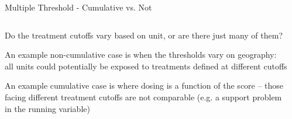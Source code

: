 \documentclass[notes,11pt, aspectratio=169]{beamer}
\newenvironment{wideitemize}{\itemize\addtolength{\itemsep}{10pt}}{\enditemize}
\begin{document}
\begin{frame}{Multiple Threshold - Cumulative vs. Not}
    \begin{columns}[onlytextwidth, T] %
      \begin{column}{.6\textwidth}
  \begin{wideitemize}
  \item Do the treatment cutoffs vary based on unit, or are there just many of them?
  \item An example non-cumulative case is when the thresholds vary on
    geography: all units could potentially be exposed to treatments
    defined at different cutoffs
  \item An example cumulative case is where dosing is a function of
    the score -- those facing different treatment cutoffs are not
    comparable (e.g. a support problem in the running variable)
  \end{wideitemize}
  \end{column}
      \begin{column}{.4\textwidth}

\end{column}
\end{columns}
\end{frame}
\end{document}
